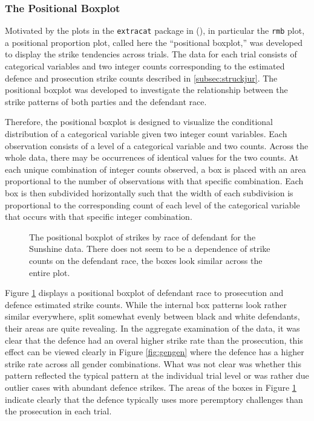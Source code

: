 \subsubsection{The Positional Boxplot}

Motivated by the plots in the \texttt{extracat} package in \Rp (\cite{extracat}), in particular the \texttt{rmb} plot, a
positional proportion plot, called here the ``positional boxplot,'' was developed to display the strike tendencies across
trials. The data for each trial consists of categorical variables and two integer counts corresponding to the estimated defence
and prosecution strike counts described in \ref{subsec:struckjur}. The positional boxplot was developed to investigate the
relationship between the strike patterns of both parties and the defendant race.

Therefore, the positional boxplot is designed to visualize the conditional distribution of a categorical variable given two
integer count variables. Each observation consists of a level of a categorical variable and two counts. Across the whole data,
there may be occurrences of identical values for the two counts. At each unique combination of integer counts observed, a box is
placed with an area proportional to the number of observations with that specific combination. Each box is then subdivided
horizontally such that the width of each subdivision is proportional to the corresponding count of each level of the categorical
variable that occurs with that specific integer combination.

\begin{figure}[h!]
  \centering
  \caption[Prosecution and Defence Strikes by Trial]{\footnotesize The positional boxplot of strikes by race of defendant for the
    Sunshine data. There does not seem to be a dependence of strike counts on the defendant race, the boxes look similar across
    the entire plot.}
  \label{fig:trialprodef}
\end{figure}

Figure \ref{fig:trialprodef} displays a positional boxplot of defendant race to prosecution and defence estimated strike
counts. While the internal box patterns look rather similar everywhere, split somewhat evenly between black and white defendants,
their areas are quite revealing. In the aggregate examination of the data, it was clear that the defence had an overal higher
strike rate than the prosecution, this effect can be viewed clearly in Figure \ref{fig:gengen} where the defence has a higher
strike rate across all gender combinations. What was not clear was whether this pattern reflected the typical pattern at the
individual trial level or was rather due outlier cases with abundant defence strikes. The areas of the boxes in Figure
\ref{fig:trialprodef} indicate clearly that the defence typically uses more peremptory challenges than the prosecution in each
trial.

